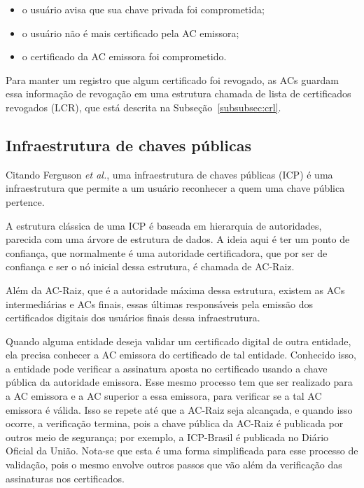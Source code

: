\documentclass{article}
\begin{document}
\begin{itemize}
  \item o usuário avisa que sua chave privada foi comprometida;
  \item o usuário não é mais certificado pela AC emissora;
  \item o certificado da AC emissora foi comprometido.
\end{itemize}

Para manter um registro que algum certificado foi revogado, as ACs guardam essa
informação de revogação em uma estrutura chamada de lista de certificados
revogados (LCR), que está descrita na Subseção~\ref{subsubsec:crl}.

\subsection{Infraestrutura de chaves públicas}\label{subsec:pki}

Citando Ferguson \textit{et al.}, uma infraestrutura de chaves públicas (ICP) é
uma infraestrutura que permite a um usuário reconhecer a quem uma chave pública
pertence.

A estrutura clássica de uma ICP é baseada em hierarquia de autoridades,
parecida com uma árvore de estrutura de dados. A ideia aqui é ter um ponto de
confiança, que normalmente é uma autoridade certificadora, que por ser de
confiança e ser o nó inicial dessa estrutura, é chamada de AC-Raiz.

Além da AC-Raiz, que é a autoridade máxima dessa estrutura, existem as ACs
intermediárias e ACs finais, essas últimas responsáveis pela emissão dos
certificados digitais dos usuários finais dessa infraestrutura.

Quando alguma entidade deseja validar um certificado digital de outra entidade,
ela precisa conhecer a AC emissora do certificado de tal entidade. Conhecido
isso, a entidade pode verificar a assinatura aposta no certificado usando a
chave pública da autoridade emissora. Esse mesmo processo tem que ser realizado
para a AC emissora e a AC superior a essa emissora, para verificar se a tal AC
emissora é válida. Isso se repete até que a AC-Raiz seja alcançada, e quando
isso ocorre, a verificação termina, pois a chave pública da AC-Raiz é publicada
por outros meio de segurança; por exemplo, a ICP-Brasil é publicada no Diário
Oficial da União. Nota-se que esta é uma forma simplificada para esse processo
de validação, pois o mesmo envolve outros passos que vão além da verificação
das assinaturas nos certificados.
\end{document}
